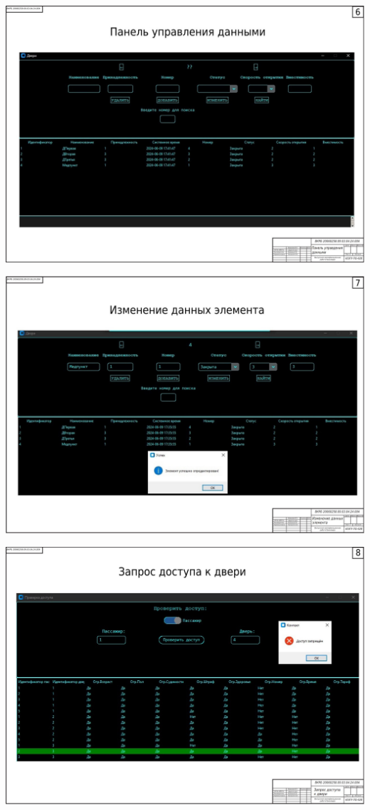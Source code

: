 \begin{landscape}
\begin{плакат}
	\includegraphics[width=0.82\linewidth]{images/плакат6}
	\label{fig:6}
\end{плакат}

\begin{плакат}
	\includegraphics[width=0.82\linewidth]{images/плакат7}
	\label{fig:7}
\end{плакат}

\begin{плакат}
	\includegraphics[width=0.82\linewidth]{images/плакат8}
	\label{fig:8}
\end{плакат}


\end{landscape}
